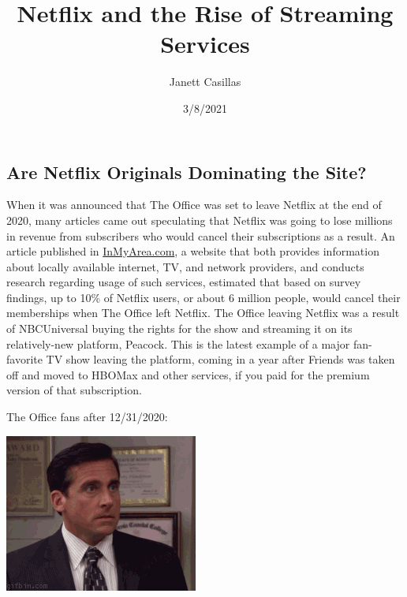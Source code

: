 \documentclass[
]{article}
\title{Netflix and the Rise of Streaming Services}
\author{Janett Casillas}
\date{3/8/2021}
\begin{document}
\maketitle

\hypertarget{are-netflix-originals-dominating-the-site}{%
\subsection{Are Netflix Originals Dominating the
Site?}\label{are-netflix-originals-dominating-the-site}}

When it was announced that The Office was set to leave Netflix at the
end of 2020, many articles came out speculating that Netflix was going
to lose millions in revenue from subscribers who would cancel their
subscriptions as a result. An article published in
\href{https://www.inmyarea.com/research/netflix-losing-subscribers-when-the-office-leaves}{InMyArea.com},
a website that both provides information about locally available
internet, TV, and network providers, and conducts research regarding
usage of such services, estimated that based on survey findings, up to
10\% of Netflix users, or about 6 million people, would cancel their
memberships when The Office left Netflix. The Office leaving Netflix was
a result of NBCUniversal buying the rights for the show and streaming it
on its relatively-new platform, Peacock. This is the latest example of a
major fan-favorite TV show leaving the platform, coming in a year after
Friends was taken off and moved to HBOMax and other services, if you
paid for the premium version of that subscription.

The Office fans after 12/31/2020:

\includegraphics{michael_scott.gif}
\end{document}
